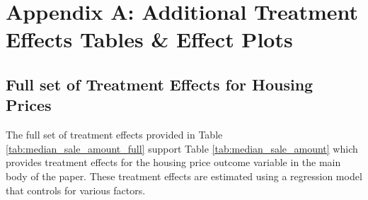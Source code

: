 \section{Appendix A: Additional Treatment Effects Tables \& Effect Plots} \label{sec:appxa}

\subsection{Full set of Treatment Effects for Housing Prices}

The full set of treatment effects provided in Table \ref{tab:median_sale_amount_full} support Table \ref{tab:median_sale_amount} which provides treatment effects for the housing price outcome variable in the main body of the paper. These treatment effects are estimated using a regression model that controls for various factors.

